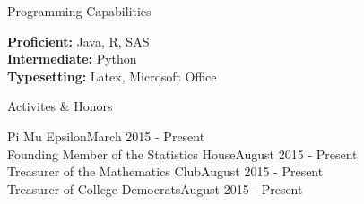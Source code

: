 \documentclass{resume} %
\begin{document}
\begin{rSection}{Programming Capabilities}
\item\textbf{Proficient:} Java, R, SAS\\
\textbf{Intermediate:} Python\\
\textbf{Typesetting:} Latex, Microsoft Office

\end{rSection}



\begin{rSection}{Activites \& Honors}
\item Pi Mu Epsilon\hfill March 2015 - Present\\
Founding Member of the Statistics House\hfill August 2015 - Present \\
Treasurer of the Mathematics Club\hfill August 2015 - Present \\
Treasurer of College Democrats\hfill August 2015 - Present
\end{rSection}
\end{document}
